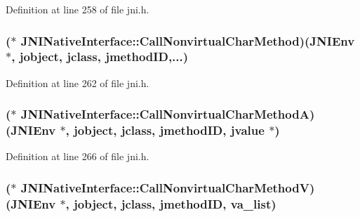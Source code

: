 Definition at line 258 of file jni.\-h.

\hypertarget{struct_j_n_i_native_interface_acaf3c46e1dc359a0007656e2026b3150}{
\subsubsection[{Call\-Nonvirtual\-Char\-Method}]{($\ast$ J\-N\-I\-Native\-Interface\-::\-Call\-Nonvirtual\-Char\-Method)({\bf J\-N\-I\-Env} $\ast$, {\bf jobject}, {\bf jclass}, {\bf jmethod\-I\-D},...)}}\label{struct_j_n_i_native_interface_acaf3c46e1dc359a0007656e2026b3150}


Definition at line 262 of file jni.\-h.

\hypertarget{struct_j_n_i_native_interface_a7b97adfcf90e2fe1ce0296acf484fda0}{
\subsubsection[{Call\-Nonvirtual\-Char\-Method\-A}]{($\ast$ J\-N\-I\-Native\-Interface\-::\-Call\-Nonvirtual\-Char\-Method\-A)({\bf J\-N\-I\-Env} $\ast$, {\bf jobject}, {\bf jclass}, {\bf jmethod\-I\-D}, {\bf jvalue} $\ast$)}}\label{struct_j_n_i_native_interface_a7b97adfcf90e2fe1ce0296acf484fda0}


Definition at line 266 of file jni.\-h.

\hypertarget{struct_j_n_i_native_interface_a0ba0a32246ec47a0e8636f07b662d35e}{
\subsubsection[{Call\-Nonvirtual\-Char\-Method\-V}]{($\ast$ J\-N\-I\-Native\-Interface\-::\-Call\-Nonvirtual\-Char\-Method\-V)({\bf J\-N\-I\-Env} $\ast$, {\bf jobject}, {\bf jclass}, {\bf jmethod\-I\-D}, va\-\_\-list)}}\label{struct_j_n_i_native_interface_a0ba0a32246ec47a0e8636f07b662d35e}


